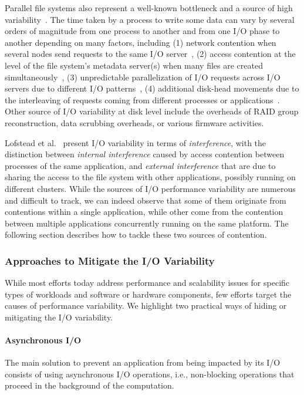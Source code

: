 			Parallel file systems also represent a well-known bottleneck and a source of high
			variability~\cite{uselton2010parallel}. The time taken
			by a process to write some data can vary by several orders of
			magnitude from one process to another and from one I/O phase to
			another depending on many factors, including (1) network contention 
			when several nodes send requests to the same I/O server~\cite{dorier2014calciom}, 
			(2) access contention at the level of the file system's metadata server(s) 
			when many files are created simultaneously~\cite{dorier:inria-00614597},
			(3) unpredictable parallelization of I/O requests across I/O servers due to different 
			I/O patterns~\cite{lofstead2010managing}, (4) additional disk-head movements due 
			to the interleaving of requests coming from different processes or applications~\cite{gainaru2014scheduling}.
			Other source of I/O variability at disk level include the overheads of RAID group reconstruction, 
			data scrubbing overheads, or various firmware activities.
		
			Lofstead et al.~\cite{lofstead2010managing} present I/O variability in terms
			of \emph{interference}, with the distinction between \emph{internal
			interference} caused by access contention between processes of
			the same application, and \emph{external interference} that are due to
			sharing the access to the file system with other applications,
			possibly running on different clusters.
			While the sources of I/O performance variability are numerous and difficult to track, we can indeed
			observe that some of them originate from contentions within a single application,
			while other come from the contention between multiple applications concurrently running on
			the same platform. The following section describes how to tackle these two sources of contention.
						
		\subsubsection{Approaches to Mitigate the I/O Variability}

			While most efforts today address performance and scalability issues for
			specific types of workloads and software or hardware components, few
			efforts target the causes of performance variability. We highlight two
			practical ways of hiding or mitigating the I/O variability.

			\paragraph{Asynchronous I/O}
				The main solution to prevent an application from being impacted by its I/O consists
				of using asynchronous I/O operations, i.e., non-blocking operations that proceed in
				the background of the computation.
	
